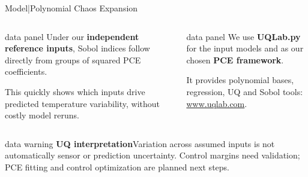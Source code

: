 \begin{frame}{Model\enspace|\enspace Polynomial Chaos Expansion}
\begin{columns}[T,onlytextwidth]
      \begin{beamercolorbox}[sep=2mm,wd=\linewidth]{data panel}
        \footnotesize
        Under our \textbf{independent reference inputs}, Sobol indices follow
        directly from groups of squared PCE coefficients.\par
        \smallskip
        This quickly shows which inputs drive predicted temperature variability,
        without costly model reruns.
      \end{beamercolorbox}
      \medskip
      \begin{beamercolorbox}[sep=2mm,wd=\linewidth]{data panel}
        \footnotesize
        We use \textbf{UQLab.py} for the input models and as our chosen
        \textbf{PCE framework}.\par
        \smallskip
        It provides polynomial bases, regression, UQ and Sobol tools:
        \href{https://www.uqlab.com/}{www.uqlab.com}.
      \end{beamercolorbox}
  \end{columns}
  \medskip
  \begin{beamercolorbox}[sep=1.5mm,wd=\textwidth]{data warning}
    \footnotesize
    \textbf{UQ interpretation}\quad Variation across assumed inputs is not automatically
    sensor or prediction uncertainty. Control margins need validation; PCE fitting
    and control optimization are planned next steps.
  \end{beamercolorbox}
\end{frame}

